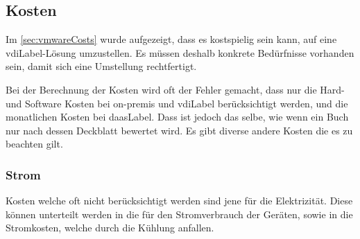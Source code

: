 \subsection{Kosten}

Im \cref{sec:vmwareCosts} wurde aufgezeigt, dass es kostspielig sein kann, auf eine \Gls{vdiLabel}-Lösung umzustellen. Es müssen deshalb konkrete Bedürfnisse vorhanden sein, damit sich eine Umstellung rechtfertigt.

Bei der Berechnung der Kosten wird oft der Fehler gemacht, dass nur die Hard- und Software Kosten bei on-premis und \Gls{vdiLabel} berücksichtigt werden, und die monatlichen Kosten bei \Gls{daasLabel}.
Dass ist jedoch das selbe, wie wenn ein Buch nur nach dessen Deckblatt bewertet wird.
Es gibt diverse andere Kosten die es zu beachten gilt.

\subsubsection{Strom}
Kosten welche oft nicht berücksichtigt werden sind jene für die Elektrizität.
Diese können unterteilt werden in die für den Stromverbrauch der Geräten, sowie in die Stromkosten, welche durch die Kühlung anfallen.

